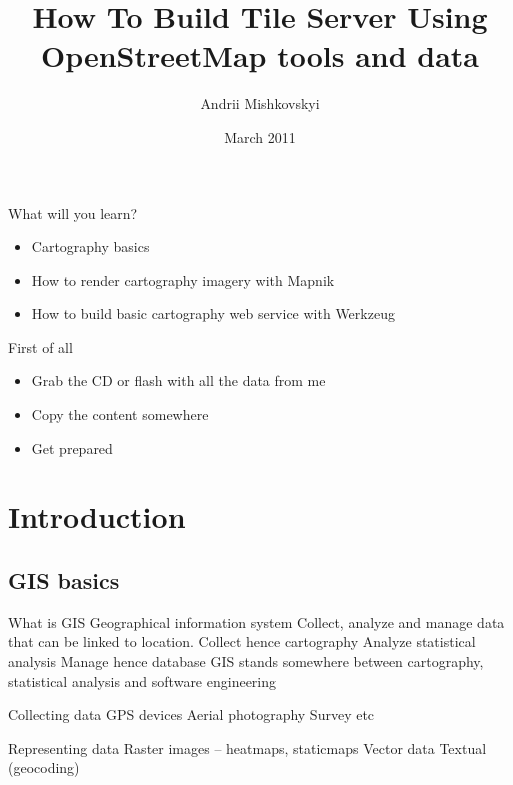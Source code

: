 \documentclass{beamer}
\begin{document}
\title{How To Build Tile Server Using OpenStreetMap tools and data}
\author{Andrii Mishkovskyi}
\date{March 2011}

\maketitle

\begin{frame}{What will you learn?}
  \begin{itemize}
  \item Cartography basics
  \item How to render cartography imagery with Mapnik
  \item How to build basic cartography web service with Werkzeug
  \end{itemize}
\end{frame}

\begin{frame}{First of all}
  \begin{itemize}
  \item Grab the CD or flash with all the data from me
  \item Copy the content somewhere
  \item Get prepared
  \end{itemize}
\end{frame}

\section{Introduction}

\subsection{GIS basics}

\begin{frame}{What is GIS}
  Geographical information system
  Collect, analyze and manage data that can be linked to location.
  Collect hence cartography
  Analyze statistical analysis
  Manage hence database
  GIS stands somewhere between cartography, statistical analysis and software engineering
\end{frame}

\begin{frame}{Collecting data}
  GPS devices
  Aerial photography
  Survey
  etc
\end{frame}

\begin{frame}{Representing data}
  Raster images -- heatmaps, staticmaps
  Vector data
  Textual (geocoding)
\end{frame}
\end{document}
